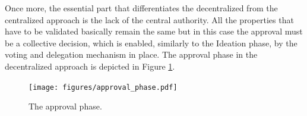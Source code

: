 Once more, the essential part that differentiates the decentralized from the centralized approach is the lack of the central authority. All the properties that have to be validated basically remain the same but in this case the approval must be a collective decision, which is enabled, similarly to the Ideation phase, by the voting and delegation mechanism in place. The approval phase in the decentralized approach is depicted in Figure \ref{approval}.

\begin{figure}[h!] %
    \caption{The approval phase.}
    \centering
    \texttt{[image: figures/approval\_phase.pdf]}
    \label{approval}
\end{figure}




